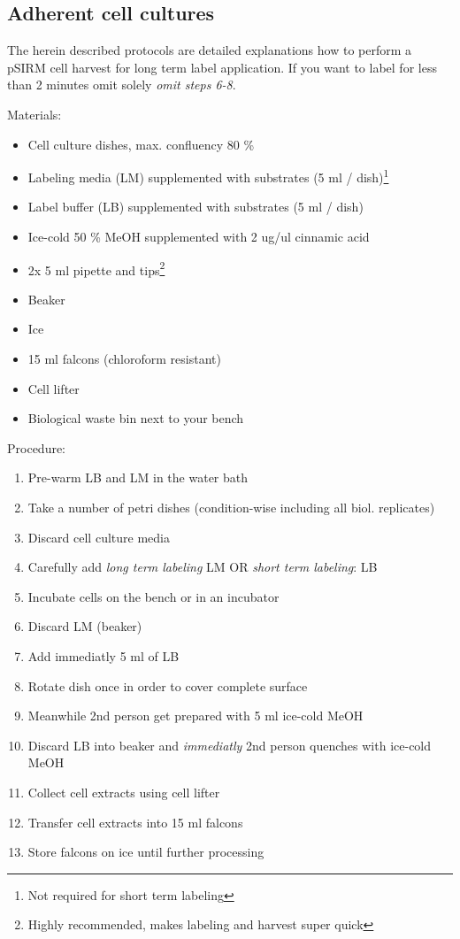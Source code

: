 \documentclass[]{book}
\providecommand{\tightlist}{%
  \setlength{\itemsep}{0pt}\setlength{\parskip}{0pt}}
\let\rmarkdownfootnote\footnote%
\def\footnote{\protect\rmarkdownfootnote}
\theoremstyle{definition}
\theoremstyle{definition}
\theoremstyle{definition}
\theoremstyle{remark}
\begin{document}
\hypertarget{psirm:adherent}{\subsection{Adherent cell
cultures}\label{psirm:adherent}}

The herein described protocols are detailed explanations how to perform
a pSIRM cell harvest for long term label application. If you want to
label for less than 2 minutes omit solely \emph{omit steps 6-8}.

Materials:

\begin{itemize}
\tightlist
\item
  Cell culture dishes, max. confluency 80 \%
\item
  Labeling media (LM) supplemented with substrates (5 ml /
  dish)\footnote{Not required for short term labeling}
\item
  Label buffer (LB) supplemented with substrates (5 ml / dish)
\item
  Ice-cold 50 \% MeOH supplemented with 2 ug/ul cinnamic acid
\item
  2x 5 ml pipette and tips\footnote{Highly recommended, makes labeling
    and harvest super quick}
\item
  Beaker
\item
  Ice
\item
  15 ml falcons (chloroform resistant)
\item
  Cell lifter
\item
  Biological waste bin next to your bench
\end{itemize}

Procedure:

\begin{enumerate}
\def\labelenumi{\arabic{enumi}.}
\tightlist
\item
  Pre-warm LB and LM in the water bath
\item
  Take a number of petri dishes (condition-wise including all biol.
  replicates)
\item
  Discard cell culture media
\item
  Carefully add \emph{long term labeling} LM OR \emph{short term
  labeling}: LB
\item
  Incubate cells on the bench or in an incubator
\item
  Discard LM (beaker)
\item
  Add immediatly 5 ml of LB
\item
  Rotate dish once in order to cover complete surface
\item
  Meanwhile 2nd person get prepared with 5 ml ice-cold MeOH
\item
  Discard LB into beaker and \emph{immediatly} 2nd person quenches with
  ice-cold MeOH
\item
  Collect cell extracts using cell lifter
\item
  Transfer cell extracts into 15 ml falcons
\item
  Store falcons on ice until further processing
\end{enumerate}
\end{document}
